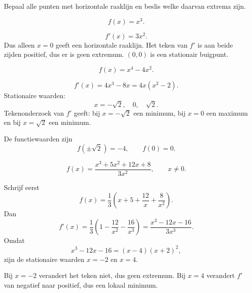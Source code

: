 \documentclass{ximera}
\begin{document}
\begin{oefening}{\oefB\ESS}
Bepaal alle punten met horizontale raaklijn en beslis welke daarvan
extrema zijn.

\begin{question}
\[
f(x)=x^3.
\]
\begin{oplossing}
\[
f'(x)=3x^2.
\]
Dus alleen \(x=0\) geeft een horizontale raaklijn. Het teken van \(f'\)
is aan beide zijden positief, dus er is geen extremum. \((0,0)\) is een
stationair buigpunt.
\end{oplossing}
\end{question}

\begin{question}
\[
f(x)=x^4-4x^2.
\]
\begin{oplossing}
\[
f'(x)=4x^3-8x=4x(x^2-2).
\]
Stationaire waarden:
\[
x=-\sqrt2,\quad0,\quad\sqrt2.
\]
Tekenonderzoek van \(f'\) geeft:
bij \(x=-\sqrt2\) een minimum, bij \(x=0\) een maximum en bij
\(x=\sqrt2\) een minimum.

De functiewaarden zijn
\[
f(\pm\sqrt2)=-4,\qquad f(0)=0.
\]
\end{oplossing}
\end{question}

\begin{question}
\[
f(x)=\frac{x^3+5x^2+12x+8}{3x^2},\qquad x\neq0.
\]
\begin{oplossing}
Schrijf eerst
\[
f(x)=\frac13\left(x+5+\frac{12}{x}+\frac{8}{x^2}\right).
\]
Dan
\[
f'(x)=\frac13\left(1-\frac{12}{x^2}-\frac{16}{x^3}\right)
=\frac{x^3-12x-16}{3x^3}.
\]
Omdat
\[
x^3-12x-16=(x-4)(x+2)^2,
\]
zijn de stationaire waarden \(x=-2\) en \(x=4\).

Bij \(x=-2\) verandert het teken niet, dus geen extremum.
Bij \(x=4\) verandert \(f'\) van negatief naar positief, dus een lokaal
minimum.
\end{oplossing}
\end{question}
\end{oefening}


\end{document}
